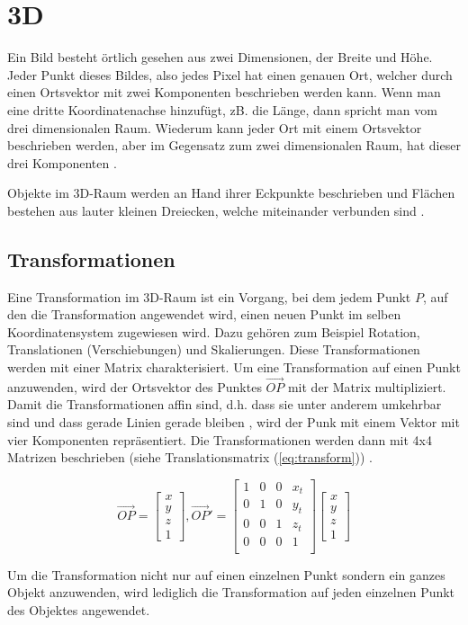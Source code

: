 \section{3D}

Ein Bild besteht örtlich gesehen aus zwei Dimensionen, der Breite und Höhe. Jeder Punkt dieses Bildes, also jedes Pixel hat einen genauen Ort, welcher durch einen Ortsvektor mit zwei Komponenten beschrieben werden kann. Wenn man eine dritte Koordinatenachse hinzufügt, zB. die Länge, dann spricht man vom drei dimensionalen Raum. Wiederum kann jeder Ort mit einem Ortsvektor beschrieben werden, aber im Gegensatz zum zwei dimensionalen Raum, hat dieser drei Komponenten \cite{computergraphics:1}.

Objekte im 3D-Raum werden an Hand ihrer Eckpunkte beschrieben und Flächen bestehen aus lauter kleinen Dreiecken, welche miteinander verbunden sind \cite{computergraphics:1}.

\subsection{Transformationen}

Eine Transformation im 3D-Raum ist ein Vorgang, bei dem jedem Punkt $P$, auf den die Transformation angewendet wird, einen neuen Punkt im selben Koordinatensystem zugewiesen wird. Dazu gehören zum Beispiel Rotation, Translationen (Verschiebungen) und Skalierungen. Diese Transformationen werden mit einer Matrix charakterisiert. Um eine Transformation auf einen Punkt anzuwenden, wird der Ortsvektor des Punktes $\vec{OP}$ mit der Matrix multipliziert. Damit die Transformationen affin sind, d.h. dass sie unter anderem umkehrbar sind und dass gerade Linien gerade bleiben \cite{affinetransformation:1}, wird der Punk mit einem Vektor mit vier Komponenten repräsentiert. Die Transformationen werden dann mit 4x4 Matrizen beschrieben (siehe  Translationsmatrix (\ref{eq:transform})) \cite{computergraphics:1}.

\begin{equation}
	\vec{OP} =
	\begin{bmatrix}
  	x \\
	y\\
	z\\
	1
	\end{bmatrix}
	, \vec{OP}' =
	\begin{bmatrix}
  	1 & 0 & 0 & x_t\\
	0 & 1 & 0 & y_t\\
	0 & 0 & 1 & z_t\\
	0 & 0 & 0 & 1\\
	\end{bmatrix}
	\begin{bmatrix}
  	x \\
	y\\
	z\\
	1
	\end{bmatrix}
	\label{eq:transform}
\end{equation}
\cite{computergraphics:1}

Um die Transformation nicht nur auf einen einzelnen Punkt sondern ein ganzes Objekt anzuwenden, wird lediglich die Transformation auf jeden einzelnen Punkt des Objektes angewendet.